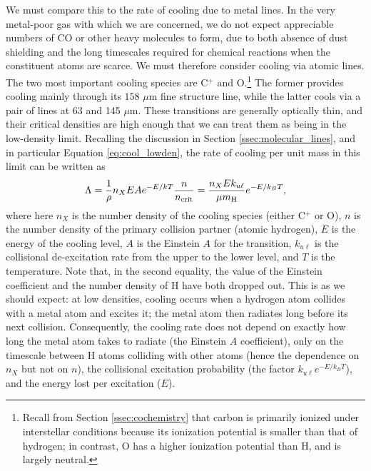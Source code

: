 We must compare this to the rate of cooling due to metal lines. In the very metal-poor gas with which we are concerned, we do not expect appreciable numbers of CO or other heavy molecules to form, due to both absence of dust shielding and the long timescales required for chemical reactions when the constituent atoms are scarce. We must therefore consider cooling via atomic lines. The two most important cooling species are C$^+$ and O.\footnote{Recall from Section \ref{ssec:cochemistry} that carbon is primarily ionized under interstellar conditions because its ionization potential is smaller than that of hydrogen; in contrast, O has a higher ionization potential than H, and is largely neutral.} The former provides cooling mainly through its $158$ $\mu$m fine structure line, while the latter cools via a pair of lines at 63 and 145 $\mu$m. These transitions are generally optically thin, and their critical densities are high enough that we can treat them as being in the low-density limit. Recalling the discussion in Section \ref{ssec:molecular_lines}, and in particular Equation \ref{eq:cool_lowden}, the rate of cooling per unit mass in this limit can be written as
\begin{equation}
\Lambda = \frac{1}{\rho}n_X E A e^{-E/kT} \frac{n}{n_{\rm crit}} = \frac{n_X E k_{u\ell}}{\mu m_{\rm H}} e^{-E/k_B T},
\end{equation}
where here $n_X$ is the number density of the cooling species (either C$^+$ or O), $n$ is the number density of the primary collision partner (atomic hydrogen), $E$ is the energy of the cooling level, $A$ is the Einstein $A$ for the transition, $k_{u\ell}$ is the collisional de-excitation rate from the upper to the lower level, and $T$ is the temperature. Note that, in the second equality, the value of the Einstein coefficient and the number density of H have both dropped out. This is as we should expect: at low densities, cooling occurs when a hydrogen atom collides with a metal atom and excites it; the metal atom then radiates long before its next collision. Consequently, the cooling rate does not depend on exactly how long the metal atom takes to radiate (the Einstein $A$ coefficient), only on the timescale between H atoms colliding with other atoms (hence the dependence on $n_X$ but not on $n$), the collisional excitation probability (the factor $k_{u\ell} e^{-E/k_B T}$), and the energy lost per excitation ($E$).

